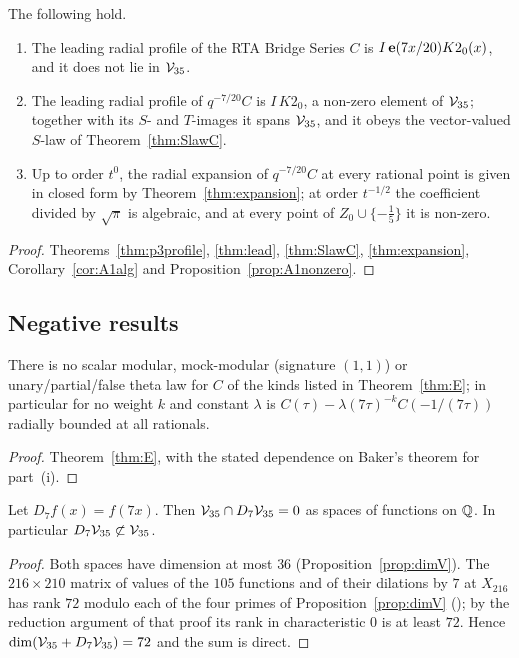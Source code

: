 \begin{theorem}\label{thm:found}
The following hold.
\begin{enumerate}[label=(\roman*)]
\item The leading radial profile of the RTA Bridge Series $C$ is $I\,\mathbf{e}(7x/20)K2_0(x)$, and it does not lie in $\mathcal V_{35}$.
\item The leading radial profile of $q^{-7/20}C$ is $I\,K2_0$, a non-zero element of $\mathcal V_{35}$; together with its $S$- and $T$-images it spans $\mathcal V_{35}$, and it
obeys the vector-valued $S$-law of Theorem~\ref{thm:SlawC}.
\item Up to order $t^0$, the radial expansion of $q^{-7/20}C$ at every rational point is given in closed form by Theorem~\ref{thm:expansion}; at order $t^{-1/2}$
the coefficient divided by $\sqrt\pi$ is algebraic, and at every point of $Z_0\cup\{-\frac15\}$ it is non-zero.
\end{enumerate}
\end{theorem}
\begin{proof}
Theorems~\ref{thm:p3profile}, \ref{thm:lead}, \ref{thm:SlawC}, \ref{thm:expansion}, Corollary~\ref{cor:A1alg} and Proposition~\ref{prop:A1nonzero}.
\end{proof}

\subsection{Negative results}
\begin{proposition}\label{prop:noscalar}
There is no scalar modular, mock-modular (signature $(1,1)$) or unary/partial/false theta law for $C$ of the kinds listed in Theorem~\ref{thm:E}; in particular for no
weight $k$ and constant $\lambda$ is $C(\tau)-\lambda(7\tau)^{-k}C(-1/(7\tau))$ radially bounded at all rationals.
\end{proposition}
\begin{proof}
Theorem~\ref{thm:E}, with the stated dependence on Baker's theorem for part~(i).
\end{proof}

\begin{proposition}\label{prop:fricke}
Let $D_7f(x)=f(7x)$. Then $\mathcal V_{35}\cap D_7\mathcal V_{35}=0$ as spaces of functions on $\mathbb{Q}$. In particular $D_7\mathcal V_{35}\not\subset\mathcal V_{35}$.
\end{proposition}
\begin{proof}
Both spaces have dimension at most $36$ (Proposition~\ref{prop:dimV}). The $216\times210$ matrix of values of the $105$ functions and of their dilations by $7$ at $X_{216}$
has rank $72$ modulo each of the four primes of Proposition~\ref{prop:dimV} (); by the reduction argument of that proof its rank in characteristic $0$ is
at least $72$. Hence $\dim(\mathcal V_{35}+D_7\mathcal V_{35})=72$ and the sum is direct.
\end{proof}

